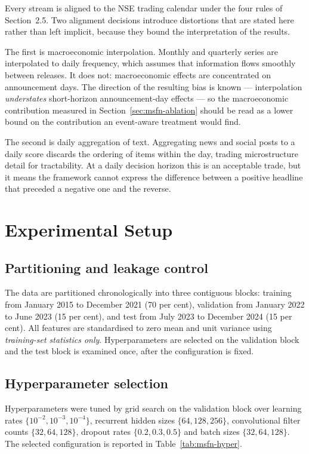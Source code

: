 Every stream is aligned to the NSE trading calendar under the four rules of Section~2.5. Two
alignment decisions introduce distortions that are stated here rather than left implicit,
because they bound the interpretation of the results.

The first is macroeconomic interpolation. Monthly and quarterly series are interpolated to daily
frequency, which assumes that information flows smoothly between releases. It does not:
macroeconomic effects are concentrated on announcement days. The direction of the resulting bias
is known --- interpolation \emph{understates} short-horizon announcement-day effects --- so the
macroeconomic contribution measured in Section~\ref{sec:msfn-ablation} should be read as a lower
bound on the contribution an event-aware treatment would find.

The second is daily aggregation of text. Aggregating news and social posts to a daily score
discards the ordering of items within the day, trading microstructure detail for tractability.
At a daily decision horizon this is an acceptable trade, but it means the framework cannot
express the difference between a positive headline that preceded a negative one and the reverse.

\section{Experimental Setup}
\label{sec:msfn-setup}

\subsection{Partitioning and leakage control}

The data are partitioned chronologically into three contiguous blocks: training from January
2015 to December 2021 (70 per cent), validation from January 2022 to June 2023 (15 per cent),
and test from July 2023 to December 2024 (15 per cent). All features are standardised to zero
mean and unit variance using \emph{training-set statistics only}. Hyperparameters are selected on
the validation block and the test block is examined once, after the configuration is fixed.

\subsection{Hyperparameter selection}

Hyperparameters were tuned by grid search on the validation block over learning rates
$\{10^{-2}, 10^{-3}, 10^{-4}\}$, recurrent hidden sizes $\{64, 128, 256\}$, convolutional filter
counts $\{32, 64, 128\}$, dropout rates $\{0.2, 0.3, 0.5\}$ and batch sizes $\{32, 64, 128\}$.
The selected configuration is reported in Table~\ref{tab:msfn-hyper}.

